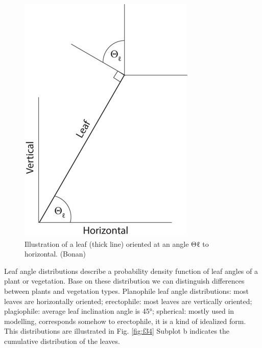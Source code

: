 \documentclass[12pt,oneside]{book}
\begin{document}
\begin{figure}

{\centering \includegraphics[width=0.8\linewidth]{figures/chap3/f33_Langle} 

}

\caption{Illustration of a leaf (thick line) oriented at an angle Θℓ to horizontal. (Bonan)}\label{fig:f33}
\end{figure}

Leaf angle distributions describe a probability density function of leaf
angles of a plant or vegetation. Base on these distribution we can
distinguish differences between plants and vegetation types. Planophile
leaf angle distributions: most leaves are horizontally oriented;
erectophile: most leaves are vertically oriented; plagiophile: average
leaf inclination angle is 45°; spherical: mostly used in modelling,
corresponds somehow to erectophile, it is a kind of idealized form. This
distributions are illustrated in Fig. \ref{fig:f34} Subplot b indicates
the cumulative distribution of the leaves.
\end{document}
